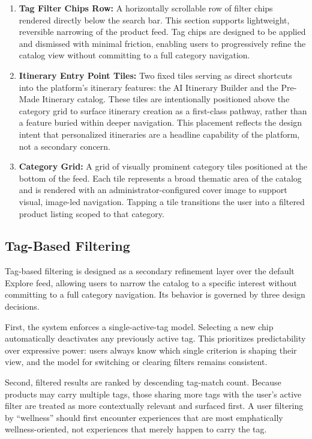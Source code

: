 \begin{enumerate}
    \item \textbf{Tag Filter Chips Row:} A horizontally scrollable row of filter chips rendered directly below the search bar. This section supports lightweight, reversible narrowing of the product feed. Tag chips are designed to be applied and dismissed with minimal friction, enabling users to progressively refine the catalog view without committing to a full category navigation.
    \item \textbf{Itinerary Entry Point Tiles:} Two fixed tiles serving as direct shortcuts into the platform's itinerary features: the AI Itinerary Builder and the Pre-Made Itinerary catalog. These tiles are intentionally positioned above the category grid to surface itinerary creation as a first-class pathway, rather than a feature buried within deeper navigation. This placement reflects the design intent that personalized itineraries are a headline capability of the platform, not a secondary concern.
    \item \textbf{Category Grid:} A grid of visually prominent category tiles positioned at the bottom of the feed. Each tile represents a broad thematic area of the catalog and is rendered with an administrator-configured cover image to support visual, image-led navigation. Tapping a tile transitions the user into a filtered product listing scoped to that category.
\end{enumerate}

\subsection{Tag-Based Filtering}
Tag-based filtering is designed as a secondary refinement layer over the default Explore feed, allowing users to narrow the catalog to a specific interest without committing to a full category navigation. Its behavior is governed by three design decisions.

First, the system enforces a single-active-tag model. Selecting a new chip automatically deactivates any previously active tag. This prioritizes predictability over expressive power: users always know which single criterion is shaping their view, and the model for switching or clearing filters remains consistent.

Second, filtered results are ranked by descending tag-match count. Because products may carry multiple tags, those sharing more tags with the user's active filter are treated as more contextually relevant and surfaced first. A user filtering by ``wellness'' should first encounter experiences that are most emphatically wellness-oriented, not experiences that merely happen to carry the tag.

